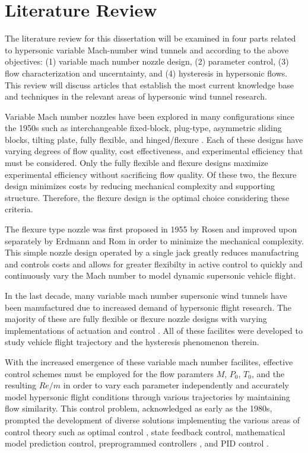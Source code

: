 \section{Literature Review}

The literature review for this dissertation will be examined in four parts related to hypersonic variable Mach-number wind tunnels and according to the above objectives: (1) variable mach number nozzle design, (2) parameter control, (3) flow characterization and uncerntainty, and (4) hysteresis in hypersonic flows. This review will discuss articles that establish the most current knowledge base and techniques in the relevant areas of hypersonic wind tunnel research.

Variable Mach number nozzles have been explored in many configurations since the 1950s such as interchangeable fixed-block, plug-type, asymmetric sliding blocks, tilting plate, fully flexible, and hinged/flexure \cite{agard-ag-3}. Each of these designs have varying degrees of flow quality, cost effectiveness, and experimental efficiency that must be considered. Only the fully flexible and flexure designs maximize experimental efficiency without sacrificing flow quality. Of these two, the flexure design minimizes costs by reducing mechanical complexity and supporting structure. Therefore, the flexure design is the optimal choice considering these criteria.

The flexure type nozzle was first proposed in 1955 by Rosen \cite{rosen} and improved upon separately by Erdmann and Rom \cite{erdmann,rom} in order to minimize the mechanical complexity. This simple nozzle design operated by a single jack greatly reduces manufactring and controls costs and allows for greater flexibilty in active control to quickly and continuously vary the Mach number to model dynamic supersonic vehicle flight.

In the last decade, many variable mach number supersonic wind tunnels have been manufactured due to increased demand of hypersonic flight research. The majority of these are fully flexible or flexure nozzle designs with varying implementations of actuation and control \cite{durand,laguarda,chen,guo,lv,qi,steeves}. All of these facilites were developed to study vehicle flight trajectory and the hysteresis phenomenon therein.

With the increased emergence of these variable mach number facilites, effective control schemes must be employed for the flow paramters $M$, $P_0$, $T_0$, and the resulting $Re/m$ in order to vary each parameter independently and accurately model hypersonic flight conditions through various trajectories by maintaining flow similarity. This control problem, acknowledged as early as the 1980s, prompted the development of diverse solutions implementing the various areas of control theory such as optimal control \cite{kraft,hwang}, state feedback control, mathematical model prediction control, preprogrammed controllers \cite{matsumoto}, and PID control \cite{fung,ilic-2,silva}.

